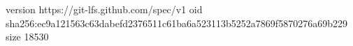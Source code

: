 version https://git-lfs.github.com/spec/v1
oid sha256:ec9a121563c63dabefd2376511c61ba6a523113b5252a7869f5870276a69b229
size 18530
